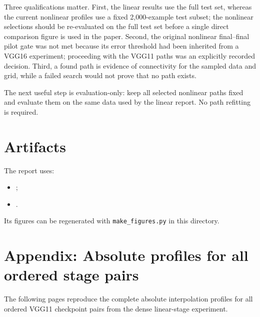 \documentclass[11pt]{article}
\begin{document}
Three qualifications matter.  First, the linear results use the full test set,
whereas the current nonlinear profiles use a fixed 2,000-example test subset;
the nonlinear selections should be re-evaluated on the full test set before a
single direct comparison figure is used in the paper.  Second, the original
nonlinear final--final pilot gate was not met because its error threshold had
been inherited from a VGG16 experiment; proceeding with the VGG11 paths was an
explicitly recorded decision.  Third, a found path is evidence of connectivity
for the sampled data and grid, while a failed search would not prove that no
path exists.

The next useful step is evaluation-only: keep all selected nonlinear paths
fixed and evaluate them on the same data used by the linear report.  No path
refitting is required.

\section*{Artifacts}

The report uses:
\begin{itemize}
    \item {};
    \item {}.
\end{itemize}
Its figures can be regenerated with \texttt{make\_figures.py} in this directory.

\clearpage
\section*{Appendix: Absolute profiles for all ordered stage pairs}

The following pages reproduce the complete absolute interpolation profiles for
all ordered VGG11 checkpoint pairs from the dense linear-stage experiment.


\end{document}
